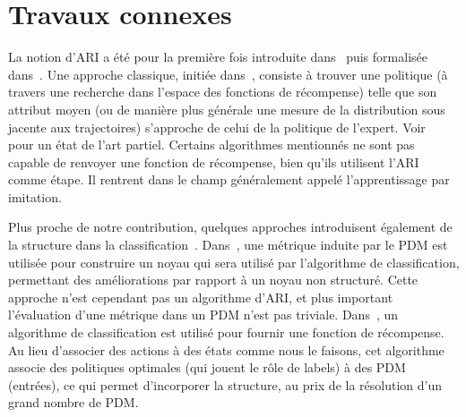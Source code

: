 \documentclass[french,utf8]{./hermes-journal}
\begin{document}

\section{Travaux connexes}
\label{seelatedWorks}

La notion d'ARI a été pour la première fois introduite dans~\cite{Russel998}
puis formalisée dans~\cite{N000}. Une approche classique, initiée dans~\cite{Abbee004}, consiste à trouver une politique (à travers une recherche dans l'espace des fonctions de récompense) telle que son attribut moyen (ou de manière plus générale une mesure de la distribution sous jacente aux trajectoires) s'approche de celui de la politique de l'expert.
%
Voir~\cite{Ne010} pour un état de l'art partiel.
%
%
Certains algorithmes mentionnés ne sont pas capable de renvoyer une fonction de récompense, bien qu'ils utilisent l'ARI comme étape. Il rentrent dans le champ généralement appelé l'apprentissage par imitation.
%

Plus proche de notre contribution, quelques approches introduisent également de la structure dans la classification~\cite{Mel010,Ratlif006}. Dans~\cite{Mel010},
une métrique induite par le PDM est utilisée pour construire un noyau qui sera utilisé par l'algorithme de classification, permettant des améliorations par rapport à un noyau non structuré. Cette approche n'est cependant pas un algorithme d'ARI, et plus important l'évaluation d'une métrique dans un PDM n'est pas triviale. Dans~\cite{Ratlif006}, un algorithme de classification est utilisé pour fournir une fonction de récompense. Au lieu d'associer des actions à des états comme nous le faisons, cet algorithme associe des politiques optimales (qui jouent le rôle de labels) à des PDM (entrées), ce qui permet d'incorporer la structure, au prix de la résolution d'un grand nombre de PDM.
\end{document}
